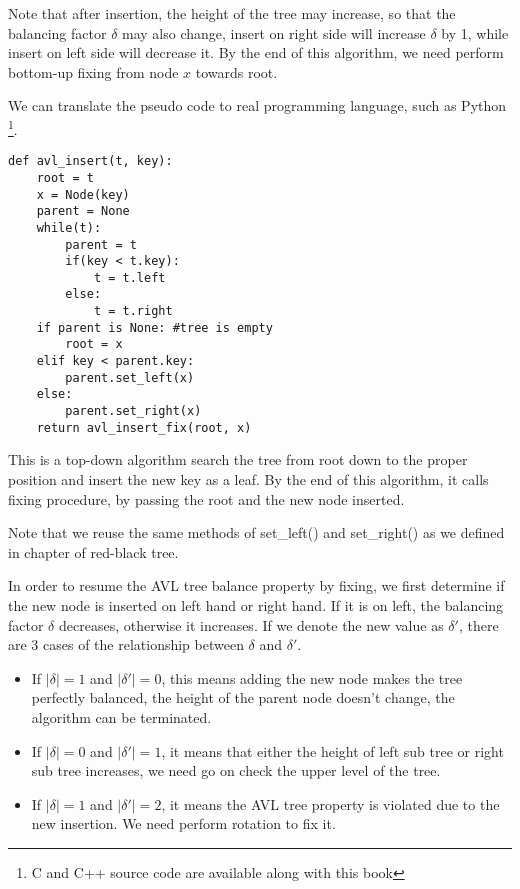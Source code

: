 \documentclass{article}
\begin{document}
Note that after insertion, the height of the tree may increase, so that
the balancing factor $\delta$ may also change, insert on right side will
increase $\delta$ by 1, while insert on left side will decrease it. By
the end of this algorithm, we need perform bottom-up fixing from node $x$
towards root.

We can translate the pseudo code to real programming language, such as
Python \footnote{C and C++ source code are available along with this book}.
\lstset{language=Python}
\begin{lstlisting}
def avl_insert(t, key):
    root = t
    x = Node(key)
    parent = None
    while(t):
        parent = t
        if(key < t.key):
            t = t.left
        else:
            t = t.right
    if parent is None: #tree is empty
        root = x
    elif key < parent.key:
        parent.set_left(x)
    else:
        parent.set_right(x)
    return avl_insert_fix(root, x)
\end{lstlisting}

This is a top-down algorithm search the tree from root down to the proper
position and insert the new key as a leaf. By the end of this algorithm, it calls fixing procedure, by passing the root and the new node inserted.

Note that we reuse the same methods of set\_left() and set\_right() as
we defined in chapter of red-black tree.

In order to resume the AVL tree balance property by fixing, we first determine if the new node is inserted on left hand or right hand. If it is on left, the balancing factor $\delta$ decreases, otherwise it increases. If we denote the new value as $\delta'$, there are 3 cases of the relationship between $\delta$ and $\delta'$.

\begin{itemize}
\item If $|\delta| = 1$ and $|\delta'| = 0$, this means adding the new node makes the tree perfectly balanced, the height of the parent node doesn't change, the algorithm can be terminated.

\item If $|\delta| = 0$ and $|\delta'| = 1$, it means that either the height of left sub tree or right sub tree increases, we need go on check the upper level of the tree.

\item If $|\delta| = 1$ and $|\delta'| = 2$, it means the AVL tree property is violated due to the new insertion. We need perform rotation to fix it.
\end{itemize}
\end{document}
